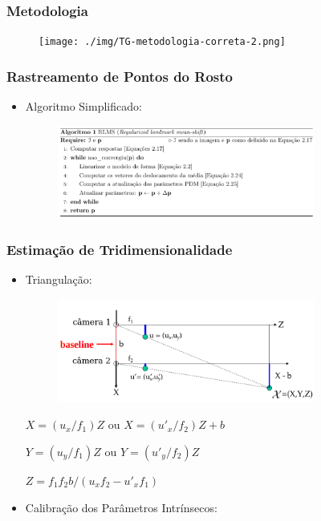 \documentclass[brazil]{beamer}
\begin{document}
\begin{frame}
	\frametitle{Metodologia}
      \begin{figure}
        \centering
        \texttt{[image: ./img/TG-metodologia-correta-2.png]}
      \end{figure}   
\end{frame}

\begin{frame}
\frametitle{Rastreamento de Pontos do Rosto}
  \begin{itemize}
      \item Algoritmo Simplificado:   
          \begin{figure}
        \centering
        \includegraphics[width = 0.8\textwidth, keepaspectratio]{./img/algorithm.png}
      \end{figure}
  \end{itemize} 
\end{frame}

\begin{frame}
\frametitle{Estimação de Tridimensionalidade}
  \begin{itemize}
      \item Triangulação:
      
      \begin{figure}
        \centering
        \includegraphics[width = 0.8\textwidth, keepaspectratio]{./img/TG_triangulation_pdf_washington_pt2.png}
      \end{figure}
      
      $X = (u_x/f_1)  Z$ ou $ X = (u'_x/f_2)  Z + b $
      
      $Y = (u_y/f_1) Z$ ou $ Y = (u'_y/f_2) Z$
      
      $Z = f_1  f_2  b / (u_x  f_2 - u'_x  f_1)$
      
      \item Calibração dos Parâmetros Intrínsecos:
  \end{itemize} 
\end{frame}
\end{document}
